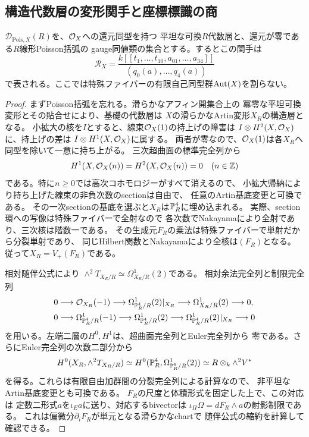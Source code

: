 \subsection{構造代数層の変形関手と座標標識の商}
\begin{lemma}[相対三次Poisson変形の形式局所環]
\label{lem:artin-relative-poisson-sheaf}
$\mathcal D_{\mathrm{Pois},X}(R)$を、$\mathcal O_X$への還元同型を持つ
平坦な可換$R$代数層と、還元が零である$R$線形Poisson括弧の
gauge同値類の集合とする。するとこの関手は
\begin{equation}\label{eq:artin-poisson-sheaf-ring}
 \mathcal R_X=
 \frac{k[[t_1,\ldots,t_{10},a_{01},\ldots,a_{34}]]}
 {(q_0(a),\ldots,q_4(a))}
\end{equation}
で表される。ここでは特殊ファイバーの有限自己同型群$\operatorname{Aut}(X)$を割らない。
\end{lemma}
\begin{proof}
まずPoisson括弧を忘れる。滑らかなアフィン開集合上の
冪零な平坦可換変形とその貼合せにより、基礎の代数層は
$X$の滑らかなArtin変形$X_R$の構造層となる。
小拡大の核を$I$とすると、線束$\mathcal O_X(1)$の持上げの障害は
$I\otimes H^2(X,\mathcal O_X)$に、持上げの差は
$I\otimes H^1(X,\mathcal O_X)$に属する。
両者が零なので、$\mathcal O_X(1)$は各$X_R$へ同型を除いて一意に持ち上がる。
三次超曲面の標準完全列から
\[
 H^1(X,\mathcal O_X(n))=H^2(X,\mathcal O_X(n))=0\quad(n\in\mathbb Z)
\]
である。特に$n\ge0$では高次コホモロジーがすべて消えるので、
小拡大帰納により持ち上げた線束の非負次数のsectionは自由で、
任意のArtin基底変更と可換である。
その一次sectionの基底を選ぶと$X_R$は$\mathbb P^4_R$に埋め込まれる。
実際、section環への写像は特殊ファイバーで全射なので
各次数でNakayamaにより全射であり、三次核は階数一である。
その生成元$F_R$の乗法は特殊ファイバーで単射だから分裂単射であり、
同じHilbert関数とNakayamaにより全核は$(F_R)$となる。
従って$X_R=V_+(F_R)$である。

相対随伴公式により
$\wedge^2T_{X_R/R}\simeq\Omega^1_{X_R/R}(2)$である。
相対余法完全列と制限完全列
\[
\begin{split}
0&\longrightarrow\mathcal O_{X_R}(-1)
 \longrightarrow\Omega^1_{\mathbb P^4_R/R}(2)|_{X_R}
 \longrightarrow\Omega^1_{X_R/R}(2)\longrightarrow0,\\
0&\longrightarrow\Omega^1_{\mathbb P^4_R/R}(-1)
 \longrightarrow\Omega^1_{\mathbb P^4_R/R}(2)
 \longrightarrow\Omega^1_{\mathbb P^4_R/R}(2)|_{X_R}\longrightarrow0
\end{split}
\]
を用いる。左端二層の$H^0,H^1$は、超曲面完全列とEuler完全列から
零である。さらにEuler完全列の次数二部分から
\begin{equation}\label{eq:artin-relative-bivectors}
 H^0(X_R,\wedge^2T_{X_R/R})
 \simeq H^0(\mathbb P^4_R,\Omega^1_{\mathbb P^4_R/R}(2))
 \simeq R\otimes_k\wedge^2V^*
\end{equation}
を得る。これらは有限自由加群間の分裂完全列による計算なので、
非平坦なArtin基底変更とも可換である。
$F_R$の尺度と体積形式を固定した上で、この対応は
定数二形式$a$を$\iota_Ea$に送り、対応するbivectorは
$\iota_{\Pi}\Omega=dF_R\wedge a$の射影制限である。
これは偏微分$\partial_iF_R$が単元となる滑らかなchartで
随伴公式の縮約を計算して確認できる。


\end{proof}
